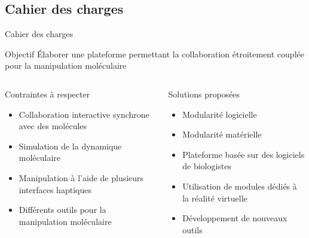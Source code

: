 \documentclass[english,french,dvips,10pt]{mybeamer}
\begin{document}
	\subsection{Cahier des charges}
	\begin{myframe}{Cahier des charges}
		\begin{myblock}{Objectif}
			Élaborer une plateforme permettant la collaboration étroitement couplée pour la manipulation moléculaire
		\end{myblock}
		\begin{columns}[T]
			\begin{column}{0.475\textwidth}
				\begin{myminusblock}{Contraintes à respecter}
					\begin{itemize}
						\item Collaboration interactive synchrone avec des molécules
						\item Simulation de la dynamique moléculaire
						\item Manipulation à l'aide de plusieurs interfaces haptiques
						\item Différents outils pour la manipulation moléculaire
					\end{itemize}
				\end{myminusblock}
			\end{column}
			\begin{column}{0.475\textwidth}
				\begin{myplusblock}{Solutions proposées}
					\begin{itemize}
						\item Modularité logicielle
						\item Modularité matérielle
						\item Plateforme basée sur des logiciels de biologistes
						\item Utilisation de modules dédiés à la réalité virtuelle
						\item Développement de nouveaux outils
					\end{itemize}
				\end{myplusblock}
			\end{column}
		\end{columns}
	\end{myframe}
\end{document}
